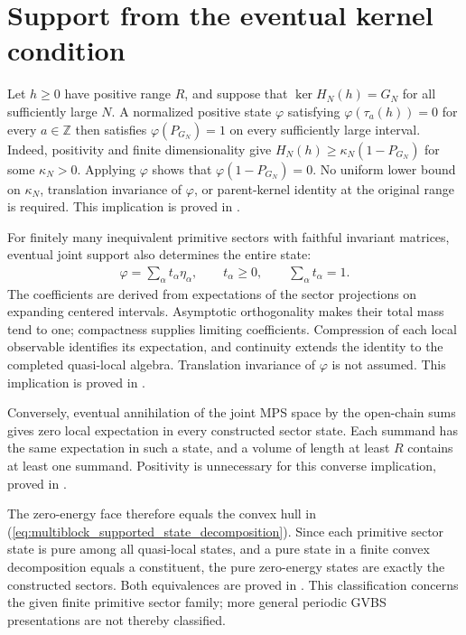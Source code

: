 \documentclass{article}
\begin{document}
\section{Support from the eventual kernel condition}
Let $h\geq0$ have positive range $R$, and suppose that
$\ker H_N(h)=G_N$ for all sufficiently large $N$.
A normalized positive state $\varphi$ satisfying
$\varphi(\tau_a(h))=0$ for every $a\in\mathbb Z$ then satisfies
$\varphi(P_{G_N})=1$ on every sufficiently large interval.
Indeed, positivity and finite dimensionality give
$H_N(h)\geq\kappa_N(1-P_{G_N})$ for some $\kappa_N>0$.
Applying $\varphi$ shows that $\varphi(1-P_{G_N})=0$.
No uniform lower bound on $\kappa_N$, translation invariance of
$\varphi$, or parent-kernel identity at the original range is required.
This implication is proved in
.

For finitely many inequivalent primitive sectors with faithful invariant
matrices, eventual joint support also determines the entire state:
\begin{align}
  \varphi=\sum_{\alpha}t_\alpha\eta_\alpha,\qquad
  t_\alpha\geq0,\qquad\sum_{\alpha}t_\alpha=1.
  \label{eq:multiblock_supported_state_decomposition}
\end{align}
The coefficients are derived from expectations of the sector projections
on expanding centered intervals. Asymptotic orthogonality makes their total
mass tend to one; compactness supplies limiting coefficients. Compression
of each local observable identifies its expectation, and continuity extends
the identity to the completed quasi-local algebra. Translation invariance
of $\varphi$ is not assumed. This implication is proved in
.

Conversely, eventual annihilation of the joint MPS space by the
open-chain sums gives zero local expectation in every constructed
sector state. Each summand has the same expectation in such a state,
and a volume of length at least $R$ contains at least one summand.
Positivity is unnecessary for this converse implication, proved in
.

The zero-energy face therefore equals the convex hull in
(\ref{eq:multiblock_supported_state_decomposition}). Since each primitive
sector state is pure among all quasi-local states, and a pure state in a
finite convex decomposition equals a constituent, the pure zero-energy
states are exactly the constructed sectors. Both equivalences are proved in
.
This classification concerns the given finite primitive sector family;
more general periodic GVBS presentations are not thereby classified.
\end{document}

